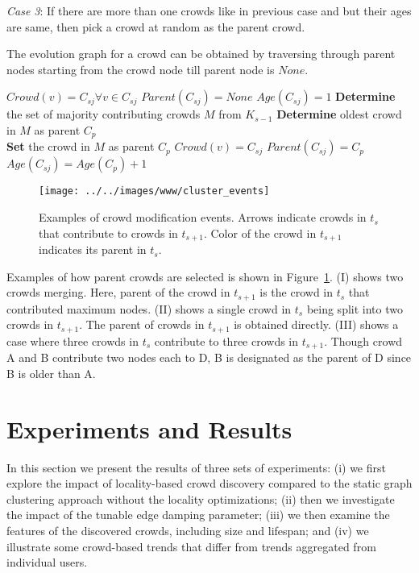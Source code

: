 \documentclass{sig-alternate}
\begin{document}
\textit{Case 3}: If there are more than one crowds like in previous case
and but their ages are same, then pick a crowd at random as the parent crowd.

The evolution graph for a crowd can be obtained by traversing through parent
nodes starting from the crowd node till parent node is $None$.

\newcommand{\CrowdEvolution}{\ensuremath{\mbox{\sc CrowdEvolution}}}
\begin{algorithm}
\caption{$\CrowdEvolution(K_{s-1}, K_s))$}\label{alg:cluster-hierarchy}
\begin{algorithmic}
\STATE $Crowd(v) = C_{sj} \forall v \in C_{sj}$
\STATE $Parent(C_{sj}) = None$
\STATE $Age(C_{sj}) = 1$
\ELSE
\STATE \textbf{Determine} the set of majority contributing crowds $M$ from
$K_{s-1}$
\STATE \textbf{Determine} oldest crowd in $M$ as parent $C_p$ 
\\
\ELSE
\STATE \textbf{Set} the crowd in $M$ as parent $C_p$
\ENDIF
{}
\STATE $Crowd(v) = C_{sj}$
\ENDFOR
\STATE $Parent(C_{sj}) = C_p$
\STATE $Age(C_{sj}) = Age(C_p) + 1$
\ENDIF
\ENDFOR
\end{algorithmic}
\end{algorithm}

\begin{figure}[!ht]
\begin{center}
\texttt{[image: ../../images/www/cluster\_events]}
\caption{Examples of crowd modification events. Arrows indicate
crowds in $t_s$ that contribute to crowds in $t_{s+1}$. Color of the
crowd in $t_{s+1}$ indicates its parent in $t_s$.}
\label{fig:cluster-events}
\end{center}
\end{figure}

Examples of how parent crowds are selected is shown in
Figure~\ref{fig:cluster-events}. (I) shows two crowds merging. Here, parent of
the crowd in $t_{s+1}$ is the crowd in $t_s$ that contributed maximum nodes. (II)
shows a single crowd in $t_s$ being split into two crowds in $t_{s+1}$. The
parent of crowds in $t_{s+1}$ is obtained directly. (III) shows a case where
three crowds in $t_s$ contribute to three crowds in $t_{s+1}$. Though crowd A and
B contribute two nodes each to D, B is designated as the parent of D since B is
older than A.

\section{Experiments and Results}
\label{sec:experiments}
In this section we present the results of three sets of experiments: (i) we first
explore the impact of locality-based crowd discovery compared to the 
static graph clustering approach without the locality optimizations; (ii) then we investigate the impact of the tunable edge damping parameter; (iii) we then examine the features of the
discovered crowds, including size and lifespan; and (iv) we illustrate some
crowd-based trends that differ from trends aggregated from individual users.
\end{document}
